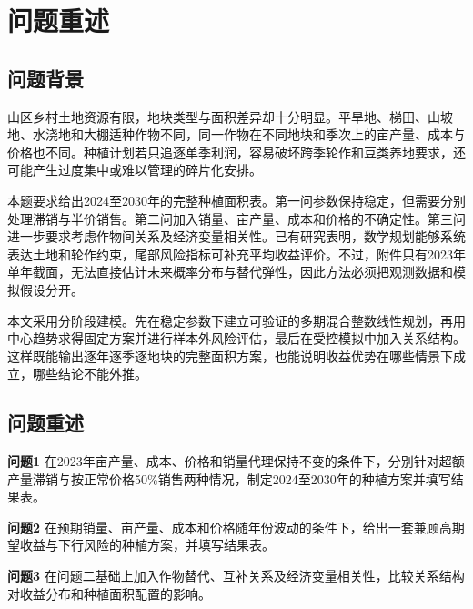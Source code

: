 
\section{问题重述}
\subsection{问题背景}

山区乡村土地资源有限，地块类型与面积差异却十分明显。平旱地、梯田、山坡地、水浇地和大棚适种作物不同，同一作物在不同地块和季次上的亩产量、成本与价格也不同。种植计划若只追逐单季利润，容易破坏跨季轮作和豆类养地要求，还可能产生过度集中或难以管理的碎片化安排。

本题要求给出2024至2030年的完整种植面积表。第一问参数保持稳定，但需要分别处理滞销与半价销售。第二问加入销量、亩产量、成本和价格的不确定性。第三问进一步要求考虑作物间关系及经济变量相关性。已有研究表明，数学规划能够系统表达土地和轮作约束，尾部风险指标可补充平均收益评价。不过，附件只有2023年单年截面，无法直接估计未来概率分布与替代弹性，因此方法必须把观测数据和模拟假设分开。

本文采用分阶段建模。先在稳定参数下建立可验证的多期混合整数线性规划，再用中心趋势求得固定方案并进行样本外风险评估，最后在受控模拟中加入关系结构。这样既能输出逐年逐季逐地块的完整面积方案，也能说明收益优势在哪些情景下成立，哪些结论不能外推。


\subsection{问题重述}

\textbf{问题1} 在2023年亩产量、成本、价格和销量代理保持不变的条件下，分别针对超额产量滞销与按正常价格50\%销售两种情况，制定2024至2030年的种植方案并填写结果表。

\textbf{问题2} 在预期销量、亩产量、成本和价格随年份波动的条件下，给出一套兼顾高期望收益与下行风险的种植方案，并填写结果表。

\textbf{问题3} 在问题二基础上加入作物替代、互补关系及经济变量相关性，比较关系结构对收益分布和种植面积配置的影响。
